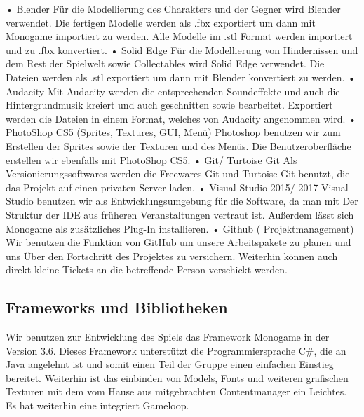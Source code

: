 \documentclass{article}
\begin{document}
• Blender\newline
Für die Modellierung des Charakters und der Gegner wird Blender verwendet.
Die fertigen Modelle werden als .fbx exportiert um dann mit Monogame importiert zu
werden. Alle Modelle im .stl Format werden importiert und zu .fbx konvertiert.\newline
• Solid Edge\newline
Für die Modellierung von Hindernissen und dem Rest der Spielwelt sowie
Collectables wird Solid Edge verwendet. Die Dateien werden als .stl exportiert um
dann mit Blender konvertiert zu werden.\newline
• Audacity\newline
Mit Audacity werden die entsprechenden Soundeffekte und auch die
Hintergrundmusik kreiert und auch geschnitten sowie bearbeitet. Exportiert
werden die Dateien in einem Format, welches von Audacity angenommen wird.\newline
• PhotoShop CS5 (Sprites, Textures, GUI, Menü)\newline
Photoshop benutzen wir zum Erstellen der Sprites sowie der Texturen und des
Menüs. Die Benutzeroberfläche erstellen wir ebenfalls mit PhotoShop CS5.\newline
• Git/ Turtoise Git\newline
Als Versionierungssoftwares werden die Freewares Git und Turtoise Git benutzt,
die das Projekt auf einen privaten Server laden.\newline
• Visual Studio 2015/ 2017\newline
Visual Studio benutzen wir als Entwicklungsumgebung für die Software, da man mit
Der Struktur der IDE aus früheren Veranstaltungen vertraut ist. Außerdem lässt sich
Monogame als zusätzliches Plug-In installieren.\newline
• Github ( Projektmanagement)\newline
Wir benutzen die Funktion von GitHub um unsere Arbeitspakete zu planen und uns
Über den Fortschritt des Projektes zu versichern. Weiterhin können auch direkt kleine
Tickets an die betreffende Person verschickt werden.

\vspace{2cm}

\subsection{Frameworks und Bibliotheken}


Wir benutzen zur Entwicklung des Spiels das Framework Monogame in der Version 3.6.
Dieses Framework unterstützt die Programmiersprache C\#, die an Java angelehnt ist und somit
einen Teil der Gruppe einen einfachen Einstieg bereitet. Weiterhin ist das einbinden von Models,
Fonts und weiteren grafischen Texturen mit dem vom Hause aus mitgebrachten
Contentmanager ein Leichtes. Es hat weiterhin eine integriert Gameloop. \newline
\end{document}
